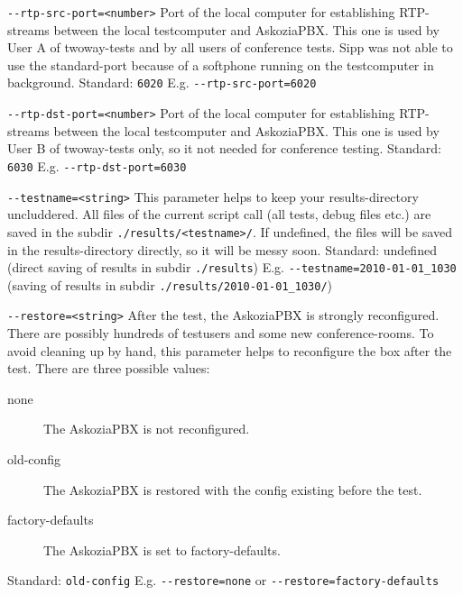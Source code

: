 \begin{description}
\item {\texttt{-{}-rtp-src-port=<number>}} \newline
Port of the local computer for establishing RTP-streams between the local testcomputer
and AskoziaPBX. This one is used by User A of twoway-tests and by all users of
conference tests. Sipp was not able to use the standard-port because of a
softphone running on the testcomputer in background.
\newline Standard: \texttt{6020}
\newline E.g. \texttt{-{}-rtp-src-port=6020}

\item {\texttt{-{}-rtp-dst-port=<number>}} \newline
Port of the local computer for establishing RTP-streams between the local testcomputer
and AskoziaPBX. This one is used by User B of twoway-tests only, so it not needed
for conference testing.
\newline Standard: \texttt{6030}
\newline E.g. \texttt{-{}-rtp-dst-port=6030}

\item {\texttt{-{}-testname=<string>}} \newline
This parameter helps to keep your results-directory uncluddered. All files of the
current script call (all tests, debug files etc.) are saved in the subdir \newline
\texttt{./results/<testname>/}. If undefined, the files will be saved in the
results-directory directly, so it will be messy soon.
\newline Standard: undefined (direct saving of results in subdir \texttt{./results})
\newline E.g. \texttt{-{}-testname=2010-01-01\_1030}
\newline (saving of results in subdir \texttt{./results/2010-01-01\_1030/})

\item {\texttt{-{}-restore=<string>}} \newline
After the test, the AskoziaPBX is strongly reconfigured. There are possibly hundreds
of testusers and some new conference-rooms. To avoid cleaning up by hand, this parameter
helps to reconfigure the box after the test. There are three possible values:
\begin{description}
	\item [none] The AskoziaPBX is not reconfigured.
	\item [old-config] The AskoziaPBX is restored with the config existing before the test.
	\item [factory-defaults] The AskoziaPBX is set to factory-defaults.
\end{description}
Standard: \texttt{old-config}
\newline E.g. \texttt{-{}-restore=none} or \texttt{-{}-restore=factory-defaults}


\end{description}

